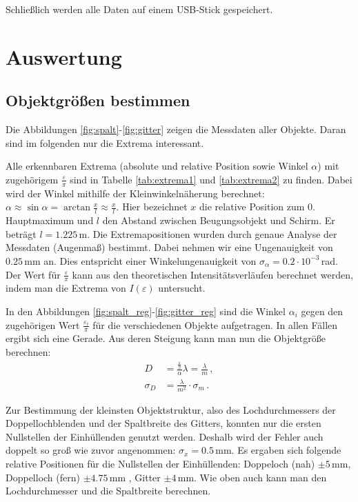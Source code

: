 \documentclass[12pt,a4paper,titlepage,headinclude,bibtotoc]{scrartcl}
\begin{document}
Schließlich werden alle Daten auf einem USB-Stick gespeichert.

\section{Auswertung}
\label{sec:auswertung}
\subsection{Objektgrößen bestimmen}
Die Abbildungen \ref{fig:spalt}-\ref{fig:gitter} zeigen die Messdaten aller Objekte.
Daran sind im folgenden nur die Extrema interessant.

Alle erkennbaren Extrema (absolute und relative Position sowie Winkel $\alpha$) mit zugehörigem $\frac{\varepsilon}{\pi}$ sind in Tabelle \ref{tab:extrema1} und \ref{tab:extrema2} zu finden.
Dabei wird der Winkel mithilfe der Kleinwinkelnäherung berechnet: $\alpha\approx\sin\alpha=\arctan\frac{x}{l}\approx\frac{x}{l}$.
Hier bezeichnet $x$ die relative Position zum 0. Hauptmaximum und $l$ den Abstand zwischen Beugungsobjekt und Schirm.
Er beträgt $l=1.225\,$m.
Die Extremapositionen wurden durch genaue Analyse der Messdaten (Augenmaß) bestimmt.
Dabei nehmen wir eine Ungenauigkeit von $0.25\,$mm an.
Dies entspricht einer Winkelungenauigkeit von $\sigma_\alpha=0.2\cdot 10^{-3}\,$rad.
Der Wert für $\frac{\varepsilon}{\pi}$ kann aus den theoretischen Intensitätsverläufen berechnet werden, indem man die Extrema von $I(\varepsilon)$ untersucht.

In den Abbildungen \ref{fig:spalt_reg}-\ref{fig:gitter_reg} sind die Winkel $\alpha_i$ gegen den zugehörigen Wert $\frac{\varepsilon_i}{\pi}$ für die verschiedenen Objekte aufgetragen.
In allen Fällen ergibt sich eine Gerade.
Aus deren Steigung kann man nun die Objektgröße berechnen:
\begin{align}
	D&=\frac{\frac{\varepsilon}{\pi}}{\alpha}\lambda=\frac{\lambda}{m}\,,
	\label{eq:objekt}\\
	\sigma_D&=\frac{\lambda}{m^2}\cdot \sigma_m\,.
\end{align}

Zur Bestimmung der kleinsten Objektstruktur, also des Lochdurchmessers der Doppellochblenden und der Spaltbreite des Gitters, konnten nur die ersten Nullstellen der Einhüllenden genutzt werden.
Deshalb wird der Fehler auch doppelt so groß wie zuvor angenommen: $\sigma_x=0.5\,$mm.
Es ergaben sich folgende relative Positionen für die Nullstellen der Einhüllenden: Doppeloch (nah) $\pm 5\,$mm, Doppelloch (fern) $\pm 4.75\,$mm , Gitter $\pm 4\,$mm.
Wie oben auch kann man den Lochdurchmesser und die Spaltbreite berechnen.
\end{document}
